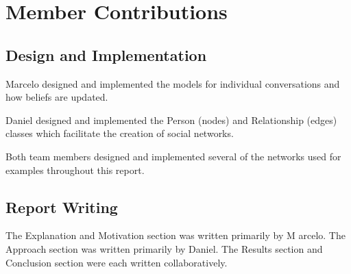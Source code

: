 \documentclass[11pt]{article}
\begin{document}
\section{Member Contributions}

\subsection{Design and Implementation}

Marcelo designed and implemented the models for individual conversations and how beliefs are updated. 

Daniel designed and implemented the Person (nodes) and Relationship (edges) classes which facilitate the creation of social networks.  

Both team members designed and implemented several of the networks used for examples throughout this report.

\subsection{Report Writing}

The Explanation and Motivation section was written primarily by M arcelo. The Approach section was written primarily by Daniel. The Results section and Conclusion section were each written collaboratively.



\end{document}
